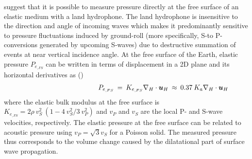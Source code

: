 \documentclass{article}
\begin{document}
	\textcite{edme2018seismic} suggest that it is possible to measure pressure directly at the free surface of an elastic medium with a land hydrophone. The land hydrophone is insensitive to the direction and angle of incoming waves which makes it predominantly sensitive to pressure fluctuations induced by ground-roll (more specifically, S-to P-conversions generated by upcoming S-waves) due to destructive summation of events at near vertical incidence angle. At the free surface of the Earth, elastic pressure $P_{e_{, FS}}$ can be written in terms of displacement in a 2D plane and its horizontal derivatives as (\cite{edme2018seismic})
	\begin{align}\label{eq:PRESS_edme}
		\shoveright \shoveright \shoveright \shoveright \shoveright \shoveright  \shoveright \shoveright  \shoveright  \shoveright  \shoveright \shoveright  
		P_{e_{, FS}} \: &=\: K_{e_{, FS}} \nabla_{H} \cdot \bm{u}_{H}  \: \approx \: 0.37 \: K_{a} \nabla_{H} \cdot \bm{u}_{H} 
	\end{align}
	where the elastic bulk modulus at the free surface is  $K_{e_{, FS}} = 2 \rho \: v_{S}^{2} \: (1- 4 \: v_{S}^{2}/3 \: v_{P}^{2}) $ and $v_{P}$ and $v_{S}$ are the local P- and S-wave velocities, respectively. The elastic pressure at the free surface can be related to acoustic pressure using $v_{P} = \sqrt{3} v_{S}$ for a Poisson solid. The measured pressure thus corresponds to the volume change caused by the dilatational part of surface wave propagation.\\ %
	
\end{document}
